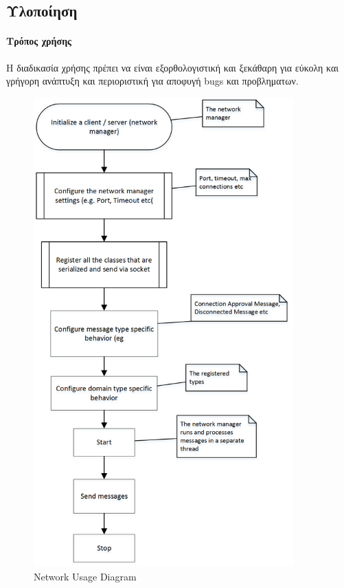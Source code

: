 \documentclass[oneside, 12pt]{book}
\begin{document}
		\subsection{Υλοποίηση}	
		\paragraph{Τρόπος χρήσης}
		Η διαδικασία χρήσης πρέπει να είναι εξορθολογιστική και ξεκάθαρη για εύκολη και γρήγορη ανάπτυξη και περιοριστική για αποφυγή bugs και προβληματων.
		\begin{figure}
			\centering
			\includegraphics[width=100mm]{Images/network_usage_diagram}
			\caption{Network Usage Diagram}
			\label{fig:Network Usage_Diagram}
		\end{figure}	
					
\end{document}
